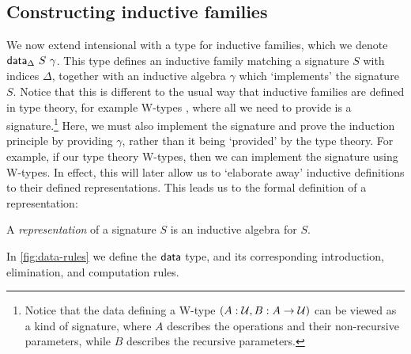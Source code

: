 \subsection{Constructing inductive families}\label{sub:constructing-inductive-families}

We now extend intensional \lambdamltt with a type for inductive families, which we
denote $\textsf{data}_\Delta\ S\ \gamma$. This type defines an inductive family
matching a signature $S$ with indices $\Delta$, together with an inductive
algebra $\gamma$ which `implements' the signature $S$. Notice that this is
different to the usual way that inductive families are defined in type theory,
for example W-types \cite{Abbott2004-va}, where all we need to provide is
a signature.\footnote{
Notice that the data defining a W-type $(A : \mathcal{U}, B : A \to \mathcal{U})$ can be viewed as a kind of signature, where $A$ describes the
operations and their non-recursive parameters, while $B$ describes the recursive parameters.}
Here, we must also implement the signature and prove
the induction principle by providing $\gamma$, rather than it being `provided' by
the type theory. For example, if our type theory W-types, then we can
implement the signature using W-types. In effect, this will later allow us to
`elaborate away' inductive definitions to their defined representations.
This leads us to the formal definition of a representation:
\begin{definition}
A \emph{representation} of a signature $S$ is an inductive algebra for $S$.
\end{definition}
In \cref{fig:data-rules} we define the $\textsf{data}$ type, and its corresponding
introduction, elimination, and computation rules.

